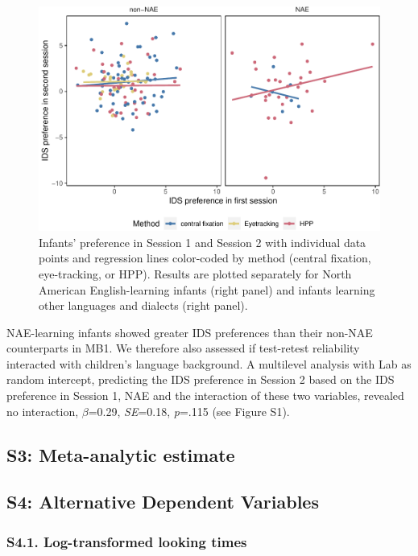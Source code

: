 \documentclass[
  man, donotrepeattitle,floatsintext]{apa6}
\begin{document}
\begin{figure}
\centering
\includegraphics{MB1T_supplement_files/figure-latex/fig1-1.pdf}
\caption{\label{fig:fig1}Infants' preference in Session 1 and Session 2 with individual data points and regression lines color-coded by method (central fixation, eye-tracking, or HPP). Results are plotted separately for North American English-learning infants (right panel) and infants learning other languages and dialects (right panel).}
\end{figure}

NAE-learning infants showed greater IDS preferences than their non-NAE counterparts in MB1. We therefore also assessed if test-retest reliability interacted with children's language background. A multilevel analysis with Lab as random intercept, predicting the IDS preference in Session 2 based on the IDS preference in Session 1, NAE and the interaction of these two variables, revealed no interaction, \(\beta\)=0.29, \emph{SE}=0.18, \emph{p}=.115 (see Figure S1).

\hypertarget{s3-meta-analytic-estimate}{%
\subsection{S3: Meta-analytic estimate}\label{s3-meta-analytic-estimate}}

\hypertarget{s4-alternative-dependent-variables}{%
\subsection{S4: Alternative Dependent Variables}\label{s4-alternative-dependent-variables}}

\hypertarget{s4.1.-log-transformed-looking-times}{%
\subsubsection{S4.1. Log-transformed looking times}\label{s4.1.-log-transformed-looking-times}}
\end{document}
